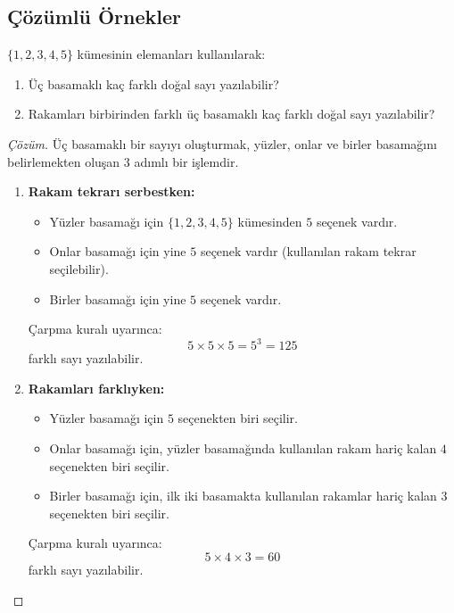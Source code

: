 \subsection{Çözümlü Örnekler}

\begin{example}
$\{1, 2, 3, 4, 5\}$ kümesinin elemanları kullanılarak:
\begin{enumerate}
  \item Üç basamaklı kaç farklı doğal sayı yazılabilir?
  \item Rakamları birbirinden farklı üç basamaklı kaç farklı doğal sayı yazılabilir?
\end{enumerate}
\end{example}
\begin{proof}[Çözüm]
Üç basamaklı bir sayıyı oluşturmak, yüzler, onlar ve birler basamağını belirlemekten oluşan $3$ adımlı bir işlemdir.
\begin{enumerate}
  \item \textbf{Rakam tekrarı serbestken:}
  \begin{itemize}
    \item Yüzler basamağı için $\{1, 2, 3, 4, 5\}$ kümesinden $5$ seçenek vardır.
    \item Onlar basamağı için yine $5$ seçenek vardır (kullanılan rakam tekrar seçilebilir).
    \item Birler basamağı için yine $5$ seçenek vardır.
  \end{itemize}
  Çarpma kuralı uyarınca:
  \[ 5 \times 5 \times 5 = 5^3 = 125 \]
  farklı sayı yazılabilir.

  \item \textbf{Rakamları farklıyken:}
  \begin{itemize}
    \item Yüzler basamağı için $5$ seçenekten biri seçilir.
    \item Onlar basamağı için, yüzler basamağında kullanılan rakam hariç kalan $4$ seçenekten biri seçilir.
    \item Birler basamağı için, ilk iki basamakta kullanılan rakamlar hariç kalan $3$ seçenekten biri seçilir.
  \end{itemize}
  Çarpma kuralı uyarınca:
  \[ 5 \times 4 \times 3 = 60 \]
  farklı sayı yazılabilir.
\end{enumerate}
\end{proof}

